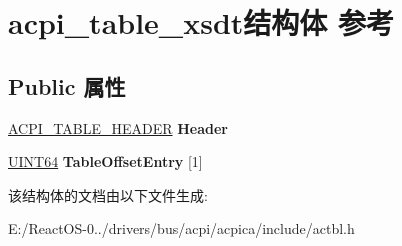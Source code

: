 \hypertarget{structacpi__table__xsdt}{}\section{acpi\+\_\+table\+\_\+xsdt结构体 参考}
\label{structacpi__table__xsdt}
\subsection*{Public 属性}
\begin{DoxyCompactItemize}
\item 
\mbox{\label{structacpi__table__xsdt_ad770ac6e37d2e19c1a728bc836fc42a7}} 
\hyperlink{structacpi__table__header}{A\+C\+P\+I\+\_\+\+T\+A\+B\+L\+E\+\_\+\+H\+E\+A\+D\+ER} {\bfseries Header}
\item 
\mbox{\label{structacpi__table__xsdt_a4e0f7b8bb6023c5d83978320be5f6205}} 
\hyperlink{_processor_bind_8h_a57be03562867144161c1bfee95ca8f7c}{U\+I\+N\+T64} {\bfseries Table\+Offset\+Entry} \mbox{[}1\mbox{]}
\end{DoxyCompactItemize}


该结构体的文档由以下文件生成\+:\begin{DoxyCompactItemize}
\item 
E\+:/\+React\+O\+S-\/0../drivers/bus/acpi/acpica/include/actbl.\+h\end{DoxyCompactItemize}
